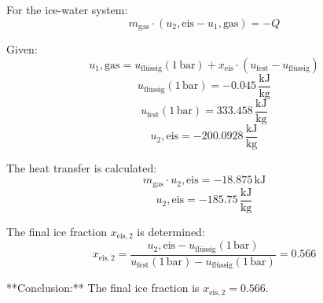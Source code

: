 For the ice-water system:  
\[
m_{\text{gas}} \cdot (u_2, \text{eis} - u_1, \text{gas}) = -Q
\]  

Given:  
\[
u_1, \text{gas} = u_{\text{flüssig}}(1 \, \text{bar}) + x_{\text{eis}} \cdot (u_{\text{fest}} - u_{\text{flüssig}})
\]  
\[
u_{\text{flüssig}}(1 \, \text{bar}) = -0.045 \, \frac{\text{kJ}}{\text{kg}}
\]  
\[
u_{\text{fest}}(1 \, \text{bar}) = 333.458 \, \frac{\text{kJ}}{\text{kg}}
\]  
\[
u_2, \text{eis} = -200.0928 \, \frac{\text{kJ}}{\text{kg}}
\]  

The heat transfer is calculated:  
\[
m_{\text{gas}} \cdot u_2, \text{eis} = -18.875 \, \text{kJ}
\]  
\[
u_2, \text{eis} = -185.75 \, \frac{\text{kJ}}{\text{kg}}
\]  

The final ice fraction \( x_{\text{eis},2} \) is determined:  
\[
x_{\text{eis},2} = \frac{u_2, \text{eis} - u_{\text{flüssig}}(1 \, \text{bar})}{u_{\text{fest}}(1 \, \text{bar}) - u_{\text{flüssig}}(1 \, \text{bar})} = 0.566
\]  

**Conclusion:**  
The final ice fraction is \( x_{\text{eis},2} = 0.566 \).